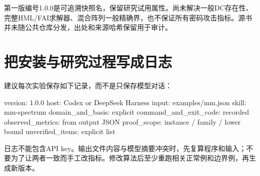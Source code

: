 第一版编号1.0.0是可追溯快照名，保留研究试用属性。尚未解决一般DC存在性、完整HML/FAI求解器、混合阵列一般精确界，也不保证所有密码攻击指标。源书并未随公共仓库分发，出处和来源哈希保留用于审计。

\section{把安装与研究过程写成日志}
建议每次实验保存如下记录，而不是只保存模型对话：
\begin{code}
version: 1.0.0
host: Codex or DeepSeek Harness
input: examples/mm.json
skill: mm-spectrum
domain_and_basis: explicit
command_and_exit_code: recorded
observed_metrics: from output JSON
proof_scope: instance / family / lower bound
unverified_items: explicit list
\end{code}
日志不能包含API key。输出文件内容与模型摘要冲突时，先复算程序和输入；不要为了让两者一致而手工改指标。修改算法后至少重跑相关正常例和边界例，再生成新版本。
